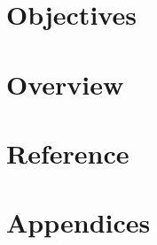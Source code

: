 
\part{Objectives}




\part{Overview}








\part{Reference}




















\part{Appendices}
\appendix


\printbibliography[heading=bibintoc]
